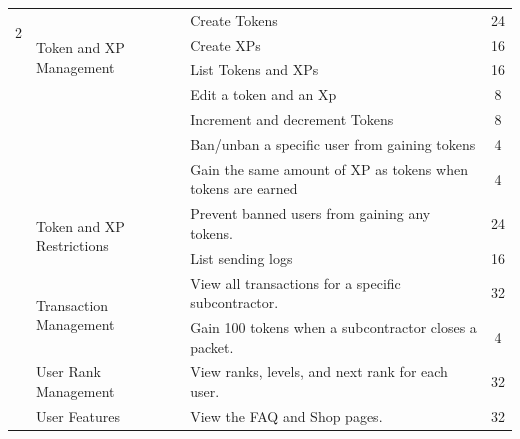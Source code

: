 \begin{longtable}{ | m{}  | m{} | m{} | c | }
    \hline
    \multirow[t]{2}{5em}{2} & \multirow{4}{5em}{Token and XP Management}  & Create  Tokens            & 24                          \\
    \cline{3-4}
                            &                                                      & Create XPs                & 16                          \\
    \cline{3-4}
                            &                                                      & List Tokens and XPs                & 16                          \\
    \cline{3-4}
                            &                                                      & Edit a token  and an Xp              & 8                           \\
    \cline{3-4}
                            &                                                      & Increment and decrement Tokens             & 8                           \\
    \cline{3-4}                        &                  & Ban/unban a specific user from gaining tokens & 4                          \\
    \cline{3-4}                        &                  & Gain the same amount of XP as tokens when tokens are earned & 4    \\
    \cline{2-4}
                            & \multirow{2}{5em}{Token and XP Restrictions}              & Prevent banned users from gaining any tokens.     & 24                          \\
    \cline{3-4}
                            &                                                      & List sending logs            & 16                          \\
    \cline{2-4}
                            & \multirow{2}{5em}{Transaction Management}                                           & View all transactions for a specific subcontractor.                & 32                          \\
    \cline{3-4}                        &                  & Gain 100 tokens when a subcontractor closes a packet. & 4                          \\
                     
    \cline{2-4}
                            & {User Rank Management}                                           & View ranks, levels, and next rank for each user.                & 32                          \\

                 
    \cline{2-4}
                              & {User Features}                                           & View the FAQ and Shop pages.                & 32                          \\

    \hline
\end{longtable}

